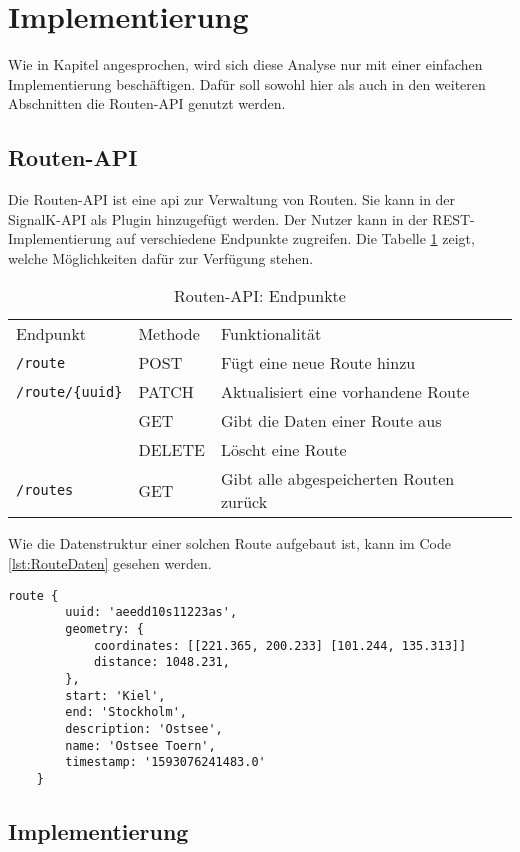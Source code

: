 \section{Implementierung}\label{Implementierung}

Wie in Kapitel  angesprochen, wird sich diese Analyse nur mit einer einfachen Implementierung beschäftigen. Dafür soll sowohl hier als auch in den weiteren Abschnitten die Routen-API genutzt werden. 

\subsection{Routen-API}

Die Routen-API ist eine \ac{api} zur Verwaltung von Routen. Sie kann in der SignalK-API als Plugin hinzugefügt werden. Der Nutzer kann in der REST-Implementierung auf verschiedene Endpunkte zugreifen. Die Tabelle \ref{tab:Endpunkte} zeigt, welche Möglichkeiten dafür zur Verfügung stehen.

\begin{table}[h]
\begin{tabular}{p{3cm} p{3cm} p{7cm}}
Endpunkt & Methode & Funktionalität \\
\verb+/route+ & POST & Fügt eine neue Route hinzu \\
\verb+/route/{uuid}+ & PATCH & Aktualisiert eine vorhandene Route \\
 & GET & Gibt die Daten einer Route aus \\
 & DELETE & Löscht eine Route \\
\verb+/routes+ & GET & Gibt alle abgespeicherten Routen zurück
\end{tabular}
\caption{Routen-API: Endpunkte}
\label{tab:Endpunkte}
\end{table}

Wie die Datenstruktur einer solchen Route aufgebaut ist, kann im Code \ref{lst:RouteDaten} gesehen werden.

\begin{lstlisting}[caption={Beispiel Datenstruktur für eine Route},captionpos=b,label=lst:RouteDaten] 
	route {
		uuid: 'aeedd10s11223as',
		geometry: {
			coordinates: [[221.365, 200.233] [101.244, 135.313]]
			distance: 1048.231,
		},
		start: 'Kiel',
		end: 'Stockholm',
		description: 'Ostsee',
		name: 'Ostsee Toern',
		timestamp: '1593076241483.0'
	}
\end{lstlisting}

\subsection{Implementierung}

